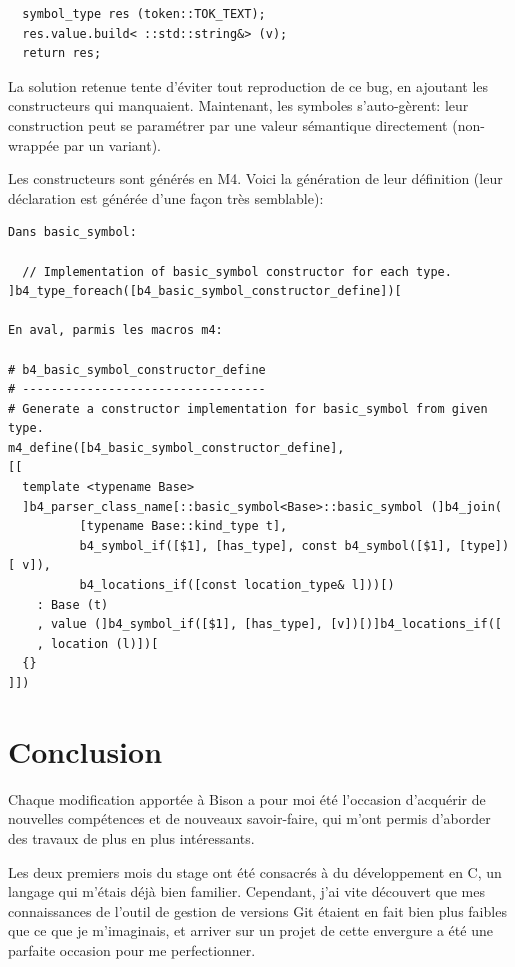 \documentclass[a4paper,11pt,twoside,final]{article}
\begin{document}
  \begin{verbatim}
  symbol_type res (token::TOK_TEXT);
  res.value.build< ::std::string&> (v);
  return res;
  \end{verbatim}

  La solution retenue tente d'éviter tout reproduction de ce bug, en ajoutant
  les constructeurs qui manquaient. Maintenant, les symboles s'auto-gèrent:
  leur construction peut se paramétrer par une valeur sémantique directement
  (non-wrappée par un variant).

  Les constructeurs sont générés en M4. Voici la génération de leur définition
  (leur déclaration est générée d'une façon très semblable):
  \begin{verbatim}
Dans basic_symbol:

  // Implementation of basic_symbol constructor for each type.
]b4_type_foreach([b4_basic_symbol_constructor_define])[

En aval, parmis les macros m4:

# b4_basic_symbol_constructor_define
# ----------------------------------
# Generate a constructor implementation for basic_symbol from given type.
m4_define([b4_basic_symbol_constructor_define],
[[
  template <typename Base>
  ]b4_parser_class_name[::basic_symbol<Base>::basic_symbol (]b4_join(
          [typename Base::kind_type t],
          b4_symbol_if([$1], [has_type], const b4_symbol([$1], [type])[ v]),
          b4_locations_if([const location_type& l]))[)
    : Base (t)
    , value (]b4_symbol_if([$1], [has_type], [v])[)]b4_locations_if([
    , location (l)])[
  {}
]])
  \end{verbatim}

  \cleardoublepage

  \section{Conclusion}

  Chaque modification apportée à Bison a pour moi été l'occasion d'acquérir de
  nouvelles compétences et de nouveaux savoir-faire, qui m'ont permis d'aborder
  des travaux de plus en plus intéressants.

  Les deux premiers mois du stage ont été consacrés à du développement en C, un
  langage qui m'étais déjà bien familier. Cependant, j'ai vite découvert que
  mes connaissances de l'outil de gestion de versions Git étaient en fait
  bien plus faibles que ce que je m'imaginais, et arriver sur un projet de
  cette envergure a été une parfaite occasion pour me perfectionner.
\end{document}
